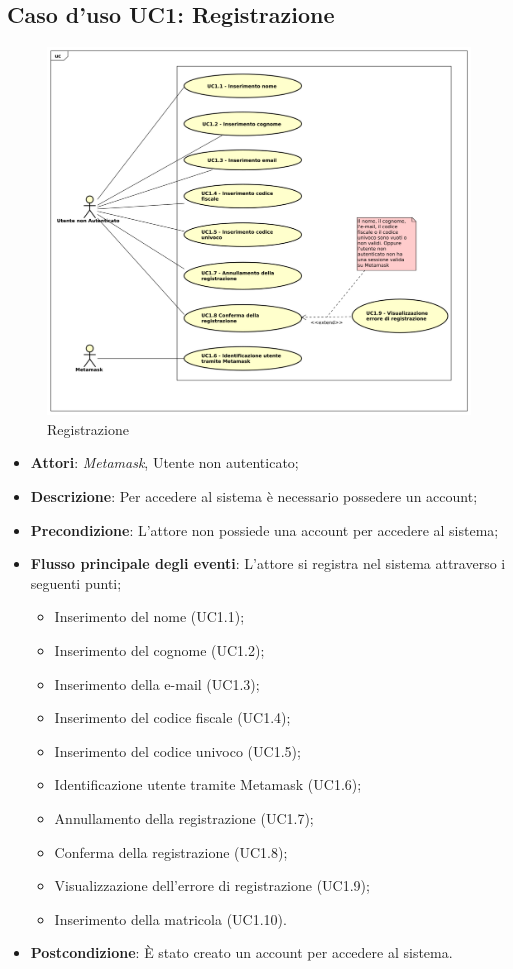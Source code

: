 \subsection{Caso d'uso \texorpdfstring{UC1}{UC1}: Registrazione }
\begin{figure} [H]
	\centering
	\includegraphics[scale=0.45]{./img/UC1.pdf}
	\caption{Registrazione }\label{}
\end{figure}
\begin{itemize}
	\item \textbf{Attori}: \emph{Metamask}, Utente non autenticato;
	\item \textbf{Descrizione}: Per accedere al sistema è necessario possedere un account;
	\item \textbf{Precondizione}: L'attore non possiede una account per accedere al sistema;
	\item \textbf{Flusso principale degli eventi}: L'attore si registra nel sistema attraverso i seguenti punti;
	\begin{itemize}
		\item Inserimento del nome (UC1.1);
		\item Inserimento del cognome (UC1.2);
		\item Inserimento della e-mail (UC1.3);
		\item Inserimento del codice fiscale (UC1.4);
		\item Inserimento del codice univoco (UC1.5);
		\item Identificazione utente tramite Metamask (UC1.6);
		\item Annullamento della registrazione (UC1.7);
		\item Conferma della registrazione (UC1.8);
		\item Visualizzazione dell'errore di registrazione (UC1.9);
		\item Inserimento della matricola (UC1.10).
	\end{itemize}
	\item \textbf{Postcondizione}: È stato creato un account per accedere al sistema.
\end{itemize}
